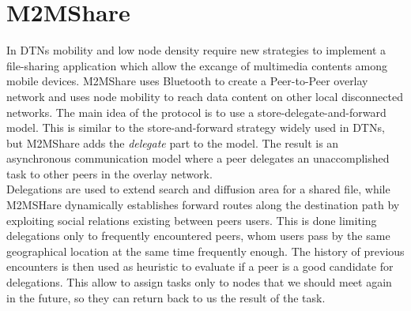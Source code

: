 
\chapter{M2MShare}\label{m2mshare} %





In DTNs mobility and low node density require new strategies to implement a file-sharing application which allow the excange of multimedia contents among mobile devices. M2MShare \cite{tesiarmir} uses Bluetooth to create a Peer-to-Peer overlay network and uses node mobility to reach data content on other local disconnected networks. The main idea of the protocol is to use a store-delegate-and-forward model. This is similar to the store-and-forward strategy widely used in DTNs, but M2MShare adds the \textit{delegate} part to the model. The result is an asynchronous communication model where a peer delegates an unaccomplished task to other peers in the overlay network.
\\

Delegations are used to extend search and diffusion area for a shared file, while M2MSHare dynamically establishes forward routes along the destination path by exploiting social relations existing between peers users. This is done limiting delegations only to frequently encountered peers, whom users pass by the same geographical location at the same time frequently enough. The history of previous encounters is then used as heuristic to evaluate if a peer is a good candidate for delegations. This allow to assign tasks only to nodes that we should meet again in the future, so they can return back to us the result of the task.
\\

